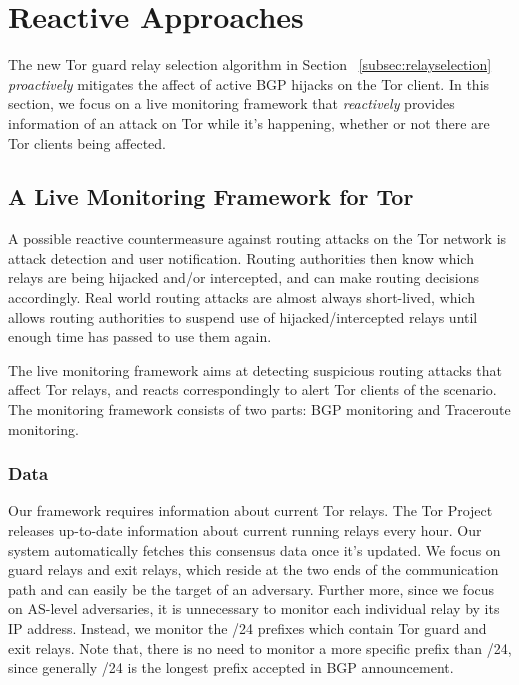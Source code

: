 \section{Reactive Approaches}
The new Tor guard relay selection algorithm in Section ~\ref{subsec:relayselection} \emph{proactively} mitigates the affect of active BGP hijacks on the Tor client. In this section, we focus on a live monitoring framework that \emph{reactively} provides information of an attack on Tor while it's happening, whether or not there are Tor clients being affected. 

\subsection{A Live Monitoring Framework for Tor}
A possible reactive countermeasure against routing attacks on the Tor network is attack 
detection and user notification.  Routing authorities then know which relays are 
being hijacked and/or intercepted, and can make routing decisions accordingly.  
Real world routing attacks are almost always short-lived, which allows 
routing authorities to suspend use of hijacked/intercepted relays until enough 
time has passed to use them again.

The live monitoring framework aims at detecting suspicious routing attacks that affect Tor relays, and reacts correspondingly to alert Tor clients of the scenario. The monitoring framework consists of two parts: BGP monitoring and Traceroute monitoring.\\

\subsubsection{Data} 
\label{sec:data}
Our framework requires information about current Tor relays.  The Tor Project releases up-to-date information about current running relays every hour. Our system automatically fetches this consensus data once it's updated. We focus on guard relays and exit relays, which reside at the two ends of the communication path and can easily be the target of an adversary. Further more, since we focus on AS-level adversaries, it is unnecessary to monitor each individual relay by its IP address. Instead, we monitor the /24 prefixes which contain Tor guard and exit relays. Note that, there is no need to monitor a more specific prefix than /24, since generally /24 is the longest prefix accepted in BGP announcement.

